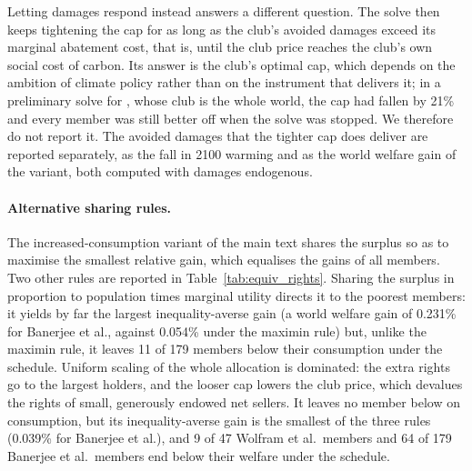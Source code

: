 \documentclass[12pt,english]{article}
\theoremstyle{remark}
\begin{document}
Letting damages respond instead answers a different question. The solve then keeps tightening the cap for as long as the club's avoided damages exceed its marginal abatement cost, that is, until the club price reaches the club's own social cost of carbon. Its answer is the club's optimal cap, which depends on the ambition of climate policy rather than on the instrument that delivers it; in a preliminary solve for \citet{banerjee_grand_2025}, whose club is the whole world, the cap had fallen by 21\% and every member was still better off when the solve was stopped. We therefore do not report it. The avoided damages that the tighter cap does deliver are reported separately, as the fall in 2100 warming and as the world welfare gain of the variant, both computed with damages endogenous.

\paragraph{Alternative sharing rules.} The increased-consumption variant of the main text shares the surplus so as to maximise the smallest relative gain, which equalises the gains of all members. Two other rules are reported in Table~\ref{tab:equiv_rights}. Sharing the surplus in proportion to population times marginal utility directs it to the poorest members: it yields by far the largest inequality-averse gain (a world welfare gain of 0.231\% for Banerjee et al., against 0.054\% under the maximin rule) but, unlike the maximin rule, it leaves 11 of 179 members below their consumption under the schedule. Uniform scaling of the whole allocation is dominated: the extra rights go to the largest holders, and the looser cap lowers the club price, which devalues the rights of small, generously endowed net sellers. It leaves no member below on consumption, but its inequality-averse gain is the smallest of the three rules (0.039\% for Banerjee et al.), and 9 of 47 Wolfram et al.\ members and 64 of 179 Banerjee et al.\ members end below their welfare under the schedule.
\end{document}
